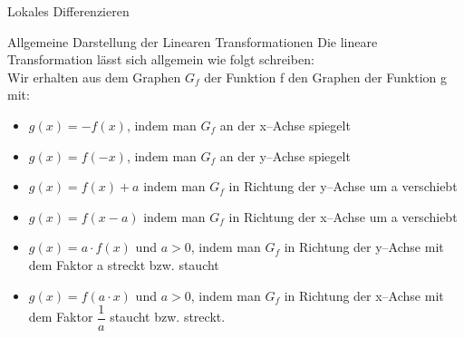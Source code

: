 \begin{section}{Lokales Differenzieren}
\begin{merke}{Allgemeine Darstellung der Linearen Transformationen} 
Die lineare Transformation lässt sich allgemein wie folgt schreiben:\\
Wir erhalten aus dem Graphen $G_f$ der Funktion f den Graphen der Funktion g mit:
\begin{itemize}
\item $g(x) = - f(x)$, indem man $G_f$ an der x--Achse spiegelt
\item $g(x) =f(-x)$, indem man $G_f$ an der y--Achse spiegelt
\item $g(x) = f(x) +a$ indem man $G_f$ in Richtung der y--Achse um a verschiebt
\item $g(x) =f(x-a)$ indem man $G_f$ in Richtung der x--Achse um a verschiebt
\item $g(x) =a\cdot f(x)$ und $a>0$, indem man $G_f$ in Richtung der y--Achse mit dem Faktor a streckt bzw. staucht
\item $g(x) =f(a\cdot x)$ und  $a>0$, indem man $G_f$ in Richtung der x--Achse mit dem Faktor $\dfrac{1}{a}$ staucht bzw. streckt.

\end{itemize}
\end{merke}
\label{lintrans}
\end{section}

